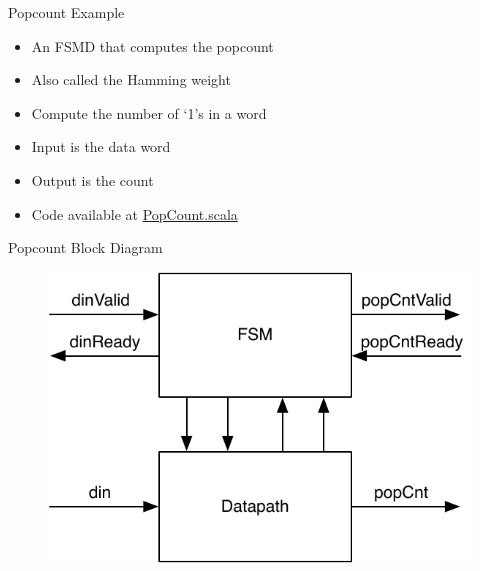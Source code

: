 \begin{frame}[fragile]{Popcount Example}
\begin{itemize}
\item An FSMD that computes the popcount
\item Also called the Hamming weight
\item Compute the number of `1's in a word
\item Input is the data word
\item Output is the count
\item Code available at \href{https://github.com/schoeberl/chisel-book/blob/master/src/main/scala/PopCount.scala}{PopCount.scala}
\end{itemize}
\end{frame}

\begin{frame}[fragile]{Popcount Block Diagram}

\begin{figure}
  \includegraphics[scale=\scale]{../figures/popcnt-fsmd}
\end{figure}
\end{frame}


